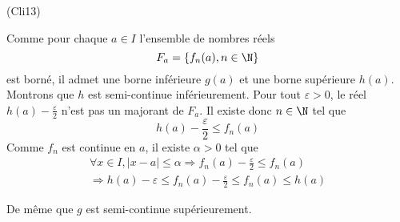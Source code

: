 \begin{tiny}(Cli13)\end{tiny}
Comme pour chaque $a\in I$ l'ensemble de nombres réels
\begin{displaymath}
  F_a = \left\lbrace f_n(a) , n\in \N\right\rbrace 
\end{displaymath}
est borné, il admet une borne inférieure $g(a)$ et une borne supérieure $h(a)$.\newline
Montrons que $h$ est semi-continue inférieurement.\newline
Pour tout $\varepsilon >0$, le réel $h(a)-\frac{\varepsilon}{2}$ n'est pas un majorant de $F_a$. Il existe donc $n\in \N$ tel que
\begin{displaymath}
  h(a)-\frac{\varepsilon}{2} \leq f_n(a)
\end{displaymath}
Comme $f_n$ est continue en $a$, il existe $\alpha >0$ tel que
\begin{multline*}
\forall x\in I, \left|x-a\right| \leq \alpha \Rightarrow f_n(a) - \frac{\varepsilon}{2} \leq f_n(a) \\
\Rightarrow h(a) - \varepsilon \leq f_n(a) - \frac{\varepsilon}{2} \leq f_n(a) \leq h(a)
\end{multline*}

De même que $g$ est semi-continue supérieurement.

